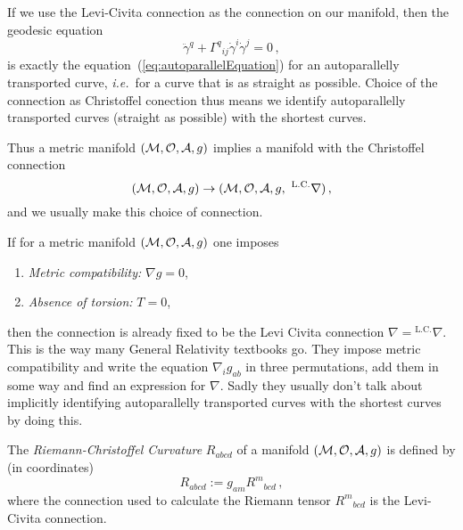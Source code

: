 \begin{note}
    If we use the Levi-Civita connection as the connection on our manifold,
    then the geodesic equation
    \begin{equation}
        \ddot{\gamma}^q + \Gamma^q{}_{ij}\dot{\gamma}^i \dot{\gamma}^j = 0\,,
    \end{equation}
    is exactly the equation~(\ref{eq:autoparallelEquation}) for an autoparallelly transported curve,
    \textit{i.e.}\ for a curve that is as straight as possible.
    Choice of the connection as Christoffel conection thus means we identify autoparallelly transported
    curves (straight as possible) with the shortest curves.
\end{note}
\begin{note}
    Thus a metric manifold $(\mathcal{M}, \mathcal{O}, \mathcal{A}, g)$ implies a manifold with the Christoffel connection
    \begin{equation}
        (\mathcal{M}, \mathcal{O}, \mathcal{A}, g) \to (\mathcal{M}, \mathcal{O}, \mathcal{A}, g,~^\text{L.C.}\nabla)\,,
    \end{equation}
    and we usually make this choice of connection.
\end{note}
\begin{note}
    If for a metric manifold $(\mathcal{M}, \mathcal{O}, \mathcal{A}, g)$ one imposes
    \begin{enumerate}
        \item \textit{Metric compatibility:} $\nabla g = 0$,
        \item \textit{Absence of torsion:} $T=0$,
    \end{enumerate}
    then the connection is already fixed to be the Levi Civita connection
    $\nabla = {}^\text{L.C.}\nabla$.
    This is the way many General Relativity textbooks go.
    They impose metric compatibility and write the equation $\nabla_i g_{ab}$ in
    three permutations, add them in some way and find an expression for $\nabla$.
    Sadly they usually don't talk about implicitly identifying autoparallelly transported
    curves with the shortest curves by doing this.
\end{note}
\begin{defn}
    The \textit{Riemann-Christoffel Curvature} $R_{abcd}$ of a manifold
    $(\mathcal{M}, \mathcal{O}, \mathcal{A}, g)$ is defined by (in coordinates)
    \begin{equation}
        R_{abcd} := g_{am} R^{m}{}_{bcd}\,,
    \end{equation}
where the connection used to calculate the Riemann tensor $R^m{}_{bcd}$ is the Levi-Civita connection.
\end{defn}
